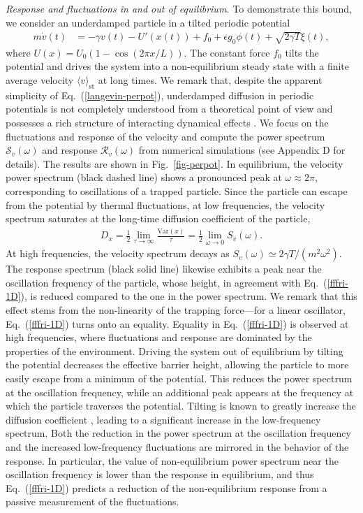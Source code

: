 \documentclass[aps,pre,twocolumn,superscriptaddress,notitlepage]{revtex4-2}
\newcommand{\av}[1]{\langle #1 \rangle}
\renewcommand{\eqref}[1]{Eq.~(\ref{#1})}
\begin{document}
\textit{Response and fluctuations in and out of equilibrium.}
To demonstrate this bound, we consider an underdamped particle in a tilted periodic potential
\begin{align}
m \dot{v}(t) &= - \gamma v(t) - U'(x(t)) + f_0  + \epsilon g_0 \phi(t) + \sqrt{2 \gamma T} \xi(t) \label{langevin-perpot} ,
\end{align}
where $U(x) = U_0 (1-\cos(2 \pi x/L))$.
The constant force $f_0$ tilts the potential and drives the system into a non-equilibrium steady state with a finite average velocity $\av{v}_\text{st}$ at long times.
We remark that, despite the apparent simplicity of \eqref{langevin-perpot}, underdamped diffusion in periodic potentials is not completely understood from a theoretical point of view and possesses a rich structure of interacting dynamical effects \cite{Vollmer1983,Lindenberg2005,Marchenko2012,Lindner2016,Fischer2018,Fischer2020,Spiechowicz2023}.
We focus on the fluctuations and response of the velocity and compute the power spectrum $\mathcal{S}_v(\omega)$ and response $\mathcal{R}_v(\omega)$ from numerical simulations (see Appendix D for details).
The results are shown in Fig.~\ref{fig-perpot}.
In equilibrium, the velocity power spectrum (black dashed line) shows a pronounced peak at $\omega \approx 2 \pi$, corresponding to oscillations of a trapped particle.
Since the particle can escape from the potential by thermal fluctuations, at low frequencies, the velocity spectrum saturates at the long-time diffusion coefficient of the particle,
\begin{align}
D_x = \frac{1}{2} \lim_{\tau \rightarrow \infty} \frac{\text{Var}(x)}{\tau} = \frac{1}{2} \lim_{\omega \rightarrow 0} S_v(\omega) .
\end{align}
At high frequencies, the velocity spectrum decays as $S_v(\omega) \simeq 2 \gamma T/(m^2 \omega^2)$.
The response spectrum (black solid line) likewise exhibits a peak near the oscillation frequency of the particle, whose height, in agreement with \eqref{fffri-1D}, is reduced compared to the one in the power spectrum.
We remark that this effect stems from the non-linearity of the trapping force---for a linear oscillator, \eqref{fffri-1D} turns onto an equality.
Equality in \eqref{fffri-1D} is observed at high frequencies, where fluctuations and response are dominated by the properties of the environment.
Driving the system out of equilibrium by tilting the potential decreases the effective barrier height, allowing the particle to more easily escape from a minimum of the potential.
This reduces the power spectrum at the oscillation frequency, while an additional peak appears at the frequency at which the particle traverses the potential.
Tilting is known to greatly increase the diffusion coefficient \cite{Reimann2001,Lindner2016}, leading to a significant increase in the low-frequency spectrum.
Both the reduction in the power spectrum at the oscillation frequency and the increased low-frequency fluctuations are mirrored in the behavior of the response.
In particular, the value of non-equilibrium power spectrum near the oscillation frequency is lower than the response in equilibrium, and thus \eqref{fffri-1D} predicts a reduction of the non-equilibrium response from a passive measurement of the fluctuations.
\end{document}
